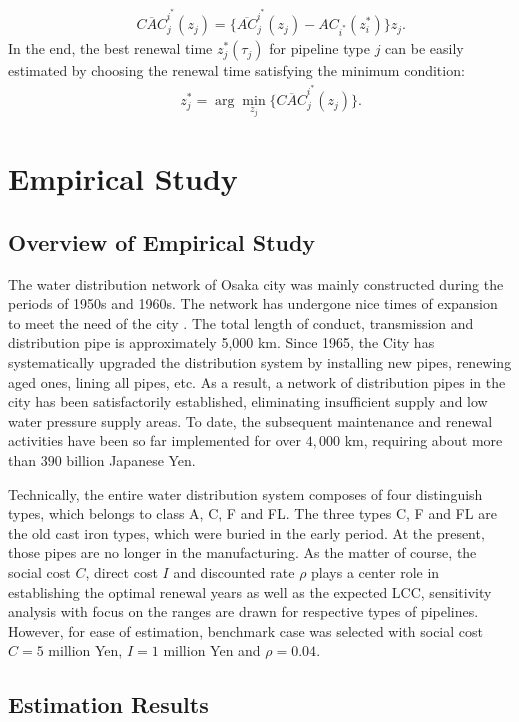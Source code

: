 \begin{eqnarray}
&& \overline{CAC}_j^{i^\ast}(z_j)= \{\overline{AC}_j^{i^\ast}(z_j)-AC_{i^\ast}(z_i^\ast)\}z_j.
\end{eqnarray}
In the end, the best renewal time $z_j^\ast(\tau_j)$ for pipeline type $j$ can be easily estimated by choosing the renewal time satisfying the minimum condition: 
\begin{eqnarray}
&& z_j^\ast=\arg \min_{z_j} \{\overline{CAC}_j^{i^\ast}(z_j)\}. \label{ssa}
\end{eqnarray}
\section{Empirical Study}
\label{58}
\subsection{Overview of Empirical Study}
\label{581}
The water distribution network of Osaka city was mainly constructed during the periods of 1950s and 1960s. The network has undergone nice times of expansion to meet the need of the city \cite{osaka}. The total length of conduct, transmission and distribution pipe is approximately 5,000 km. Since 1965, the City has systematically upgraded the distribution system by installing new pipes, renewing aged ones, lining all pipes, etc. As a result, a network of distribution pipes in the city has been satisfactorily established, eliminating insufficient supply and low water pressure supply areas. To date, the subsequent maintenance and renewal activities have been so far implemented for over $4,000$ km, requiring about more than $390$ billion Japanese Yen.

Technically, the entire water distribution system composes of four distinguish types, which belongs to class A, C, F and FL. The three types C, F and FL are the old cast iron types, which were buried in the early period. At the present, those pipes are no longer in the manufacturing. As the matter of course, the social cost $C$, direct cost $I$ and discounted rate $\rho$ plays a center role in establishing the optimal renewal years as well as the expected LCC, sensitivity analysis with focus on the ranges are drawn for respective types of pipelines. However, for ease of estimation, benchmark case was selected with social cost $C=5$ million Yen, $I =1$ million Yen and $\rho=0.04$.%
\subsection{Estimation Results}
\label{582}

